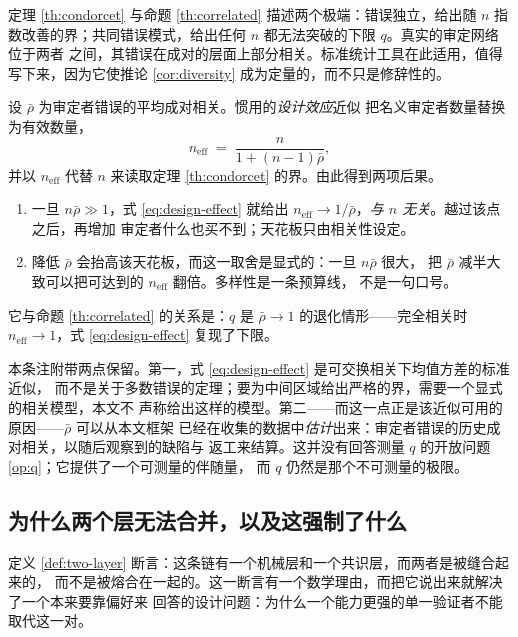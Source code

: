 \begin{remark}\label{rmk:design-effect}
定理 \ref{th:condorcet} 与命题 \ref{th:correlated} 描述两个极端：错误独立，给出随 $n$
指数改善的界；共同错误模式，给出任何 $n$ 都无法突破的下限 $q$。真实的审定网络位于两者
之间，其错误在成对的层面上部分相关。标准统计工具在此适用，值得写下来，因为它使推论
\ref{cor:diversity} 成为定量的，而不只是修辞性的。

设 $\bar\rho$ 为审定者错误的平均成对相关。惯用的\emph{设计效应}近似 \cite{kish1965}
把名义审定者数量替换为有效数量，
\begin{equation}\label{eq:design-effect}
n_{\mathrm{eff}} \;=\; \frac{n}{1 + (n-1)\bar\rho},
\end{equation}
并以 $n_{\mathrm{eff}}$ 代替 $n$ 来读取定理 \ref{th:condorcet} 的界。由此得到两项后果。
\begin{enumerate}[label=(\alph*)]
\item 一旦 $n\bar\rho \gg 1$，式 \eqref{eq:design-effect} 就给出
      $n_{\mathrm{eff}} \to 1/\bar\rho$，\emph{与 $n$ 无关}。越过该点之后，再增加
      审定者什么也买不到；天花板只由相关性设定。
\item 降低 $\bar\rho$ 会抬高该天花板，而这一取舍是显式的：一旦 $n\bar\rho$ 很大，
      把 $\bar\rho$ 减半大致可以把可达到的 $n_{\mathrm{eff}}$ 翻倍。多样性是一条预算线，
      不是一句口号。
\end{enumerate}
它与命题 \ref{th:correlated} 的关系是：$q$ 是 $\bar\rho \to 1$ 的退化情形——完全相关时
$n_{\mathrm{eff}} \to 1$，式 \eqref{eq:design-effect} 复现了下限。

本条注附带两点保留。第一，式 \eqref{eq:design-effect} 是可交换相关下均值方差的标准近似，
而不是关于多数错误的定理；要为中间区域给出严格的界，需要一个显式的相关模型，本文不
声称给出这样的模型。第二——而这一点正是该近似可用的原因——$\bar\rho$ 可以从本文框架
已经在收集的数据中\emph{估计}出来：审定者错误的历史成对相关，以随后观察到的缺陷与
返工来结算。这并没有回答测量 $q$ 的开放问题 \ref{op:q}；它提供了一个可测量的伴随量，
而 $q$ 仍然是那个不可测量的极限。
\end{remark}

\subsection{为什么两个层无法合并，以及这强制了什么}\label{sec:enrichment}

定义 \ref{def:two-layer} 断言：这条链有一个机械层和一个共识层，而两者是被缝合起来的，
而不是被熔合在一起的。这一断言有一个数学理由，而把它说出来就解决了一个本来要靠偏好来
回答的设计问题：为什么一个能力更强的单一验证者不能取代这一对。

